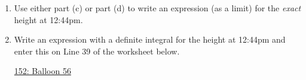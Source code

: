 \documentclass{ximera}
\begin{document}
\begin{question}
\begin{enumerate}
\item Use either part (c) or part (d) to write an expression (as a limit) for the \emph{exact} height at 12:44pm.

\item Write an expression with a definite integral for the height at 12:44pm and enter this on Line 39 of the worksheet below.


\begin{onlineOnly}
    \begin{center}
\end{center}
\end{onlineOnly}
 
\href{https://www.desmos.com/calculator/qwuqprd9vf}{152: Balloon 56}
 
\end{enumerate}
\end{question}
\end{document}
